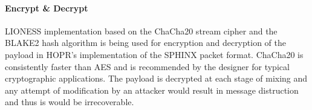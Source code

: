 \paragraph{Encrypt \& Decrypt}
LIONESS implementation based on the ChaCha20 stream cipher and the BLAKE2 hash algorithm is being used for encryption and decryption of the payload in HOPR's implementation of the SPHINX packet format. ChaCha20 is consistently faster than AES and is recommended by the designer for typical cryptographic applications.
The payload is decrypted at each stage of mixing and any attempt of modification by an attacker would result in message distruction and thus is would be irrecoverable. 









